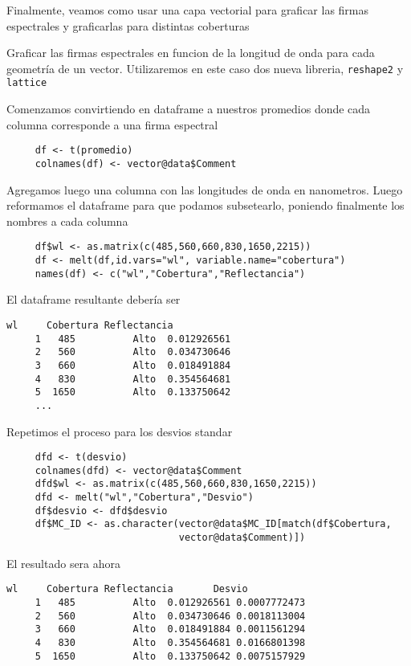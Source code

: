 Finalmente, veamos como usar una capa vectorial para graficar las
firmas espectrales y graficarlas para distintas coberturas

\begin{exa}
     Graficar las firmas espectrales en funcion de la longitud de onda para cada
     geometr\'ia de un vector. Utilizaremos en este caso dos nueva libreria,
     \texttt{reshape2} y \texttt{lattice}

     Comenzamos convirtiendo en dataframe a nuestros promedios donde cada
     columna corresponde a una firma espectral
     \begin{lstlisting}
     df <- t(promedio)
     colnames(df) <- vector@data$Comment
     \end{lstlisting}
     Agregamos luego una columna con las longitudes de onda en nanometros. Luego
     reformamos el dataframe para que podamos subsetearlo, poniendo finalmente
     los nombres a cada columna
     \begin{lstlisting}
     df$wl <- as.matrix(c(485,560,660,830,1650,2215))
     df <- melt(df,id.vars="wl", variable.name="cobertura")
     names(df) <- c("wl","Cobertura","Reflectancia")
     \end{lstlisting}
     El dataframe resultante deber\'ia ser
     \begin{Verbatim}[fontsize=\small]
          wl     Cobertura Reflectancia
     1   485          Alto  0.012926561
     2   560          Alto  0.034730646
     3   660          Alto  0.018491884
     4   830          Alto  0.354564681
     5  1650          Alto  0.133750642
     ...
     \end{Verbatim}
     Repetimos el proceso para los desvios standar
     \begin{lstlisting}
     dfd <- t(desvio)
     colnames(dfd) <- vector@data$Comment
     dfd$wl <- as.matrix(c(485,560,660,830,1650,2215))
     dfd <- melt("wl","Cobertura","Desvio")
     df$desvio <- dfd$desvio
     df$MC_ID <- as.character(vector@data$MC_ID[match(df$Cobertura,
                              vector@data$Comment)])
     \end{lstlisting}
     El resultado sera ahora
     \begin{Verbatim}[fontsize=\small]
          wl     Cobertura Reflectancia       Desvio
     1   485          Alto  0.012926561 0.0007772473
     2   560          Alto  0.034730646 0.0018113004
     3   660          Alto  0.018491884 0.0011561294
     4   830          Alto  0.354564681 0.0166801398
     5  1650          Alto  0.133750642 0.0075157929

\end{Verbatim}
\end{exa}
